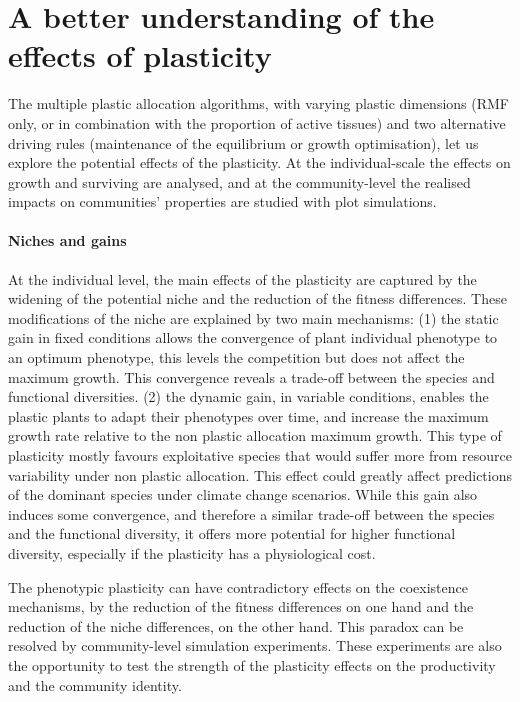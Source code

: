 \section{A better understanding of the effects of plasticity}

The multiple plastic allocation algorithms, with varying plastic dimensions (RMF only, or in combination with the proportion of active tissues) and two alternative driving rules (maintenance of the equilibrium or growth optimisation), let us explore the potential effects of the plasticity. At the individual-scale the effects on growth and surviving are analysed, and at the community-level the realised impacts on communities' properties are studied with plot simulations.

\paragraph{Niches and gains}

At the individual level, the main effects of the plasticity are captured by the widening of the potential niche and the reduction of the fitness differences. These modifications of the niche are explained by two main mechanisms: (1) the static gain in fixed conditions allows the convergence of plant individual phenotype to an optimum phenotype, this levels the competition but does not affect the maximum growth. This convergence reveals a trade-off between the species and functional diversities. (2) the dynamic gain, in variable conditions, enables the plastic plants to adapt their phenotypes over time, and increase the maximum growth rate relative to the non plastic allocation maximum growth. This type of plasticity mostly favours exploitative species that would suffer more from resource variability under non plastic allocation. This effect could greatly affect predictions of the dominant species under climate change scenarios. While this gain also induces some convergence, and therefore a similar trade-off between the species and the functional diversity, it offers more potential for higher functional diversity, especially if the plasticity has a physiological cost.

The phenotypic plasticity can have contradictory effects on the coexistence mechanisms, by the reduction of the fitness differences on one hand and the reduction of the niche differences, on the other hand. This paradox can be resolved by community-level simulation experiments. These experiments are also the opportunity to test the strength of the plasticity effects on the productivity and the community identity.

